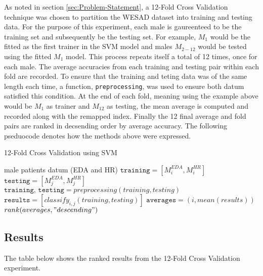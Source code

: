 As noted in section \ref{sec:Problem-Statement}, a 12-Fold Cross Validation technique was chosen 
to partition the WESAD dataset into training and testing data. For the purpose of 
this experiment, each male is gaureenteed to be the training set and subsequently be 
the testing set. For example, $M_1$ would be the fitted as the first trainer in 
the SVM model and males $M_{2-12}$ would be tested using the fitted $M_1$ model. 
This process repeats itself a total of 12 times, once for each male. The average 
accuracies from each training and testing pair within each fold are recorded. 
To ensure that the training and teting data was of the same length each time, 
a function, \texttt{preprocessing}, was used to ensure both datum satisfied this condition.
At the end of each fold, meaning using the example above would be $M_1$ 
as trainer and $M_{12}$ as testing, the mean average is computed and recorded 
along with the remapped index. Finally the 12 final average and fold pairs 
are ranked in decsending order by average accuracy. The following pseduocode 
denotes how the methods above were expressed. 

\begin{algorithm}
\caption{12-Fold Cross Validation using SVM}\label{12FCV}
\begin{algorithmic}[1]
\scriptsize
{} male patients datum (EDA and HR)
\State $\texttt{training} = [M_i^{EDA}, M_i^{HR}]$
 
\State $\texttt{testing} = [M_j^{EDA}, M_j^{HR}]$
\State $\texttt{training, testing} = preprocessing(training, testing)$
\EndIf
\State $\texttt{results} = [classify_{i,j}(training, testing)]$
\EndFor
\State $\texttt{averages} = (i,mean(results))$ 
\EndFor
\State $rank(averages, "descending")$
\end{algorithmic}
\end{algorithm}


\subsection{Results}
\label{sec:Results}

The table below shows the ranked results from the 12-Fold Cross Validation experiment.

